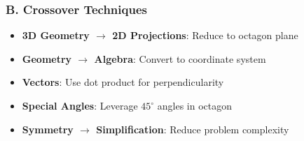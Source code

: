 \documentclass[12pt]{article}
\begin{document}
\begin{tacticalbox}
\subsubsection*{B. Crossover Techniques}

\begin{itemize}
    \item \textbf{3D Geometry $\to$ 2D Projections}: Reduce to octagon plane
    \item \textbf{Geometry $\to$ Algebra}: Convert to coordinate system
    \item \textbf{Vectors}: Use dot product for perpendicularity
    \item \textbf{Special Angles}: Leverage $45^\circ$ angles in octagon
    \item \textbf{Symmetry $\to$ Simplification}: Reduce problem complexity
\end{itemize}

\end{tacticalbox}
\end{document}
